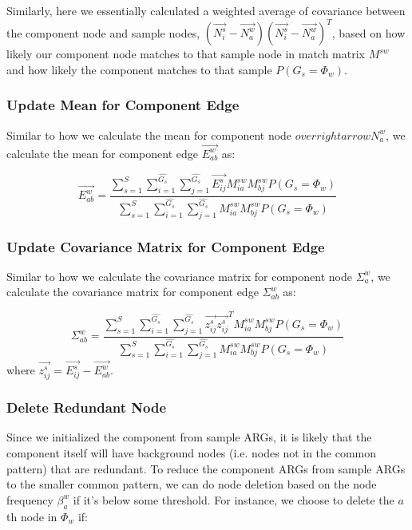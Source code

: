 Similarly, here we essentially calculated a weighted average of covariance between the component node and sample nodes, $(\overrightarrow{N^s_i} - \overrightarrow{N^w_a})(\overrightarrow{N^s_i} - \overrightarrow{N^w_a})^T$, based on how likely our component node matches to that sample node in match matrix $M^{sw}$ and how likely the component matches to that sample $P(G_s=\Phi_w)$.\\

\subsubsection{Update Mean for Component Edge}

Similar to how we calculate the mean for component node $overrightarrow{N^w_a}$, we calculate the mean for component edge $\overrightarrow{E^w_{ab}}$ as:

\begin{equation} 
\overrightarrow{E^w_{ab}}=\frac{\sum^S_{s=1}\sum^{\widehat{G_s}}_{i=1}\sum^{\widehat{G_s}}_{j=1}\overrightarrow{E^s_{ij}}M^{sw}_{ia}M^{sw}_{bj}P(G_s=\Phi_w)}{\sum^S_{s=1}\sum^{\widehat{G_s}}_{i=1}\sum^{\widehat{G_s}}_{j=1}M^{sw}_{ia}M^{sw}_{bj}P(G_s=\Phi_w)}
\end{equation}

\subsubsection{Update Covariance Matrix for Component Edge}

Similar to how we calculate the covariance matrix for component node $\Sigma^w_a$, we calculate the covariance matrix for component edge $\Sigma^w_{ab}$ as:

\begin{equation} 
\Sigma^w_{ab}=\frac{\sum^S_{s=1}\sum^{\widehat{G_s}}_{i=1}\sum^{\widehat{G_s}}_{j=1}\overrightarrow{z^s_{ij}}\overrightarrow{z^s_{ij}}^TM^{sw}_{ia}M^{sw}_{bj}P(G_s=\Phi_w)}{\sum^S_{s=1}\sum^{\widehat{G_s}}_{i=1}\sum^{\widehat{G_s}}_{j=1}M^{sw}_{ia}M^{sw}_{bj}P(G_s=\Phi_w)}
\end{equation}
where $\overrightarrow{z^s_{ij}} = \overrightarrow{E^s_{ij}} - \overrightarrow{E^w_{ab}}$.\\

\subsubsection{Delete Redundant Node}

Since we initialized the component from sample ARGs, it is likely that the component itself will have background nodes (i.e. nodes not in the common pattern) that are redundant. To reduce the component ARGs from sample ARGs to the smaller common pattern, we can do node deletion based on the node frequency $\beta^w_a$ if it's below some threshold. For instance, we choose to delete the $a$th node in $\Phi_w$ if:

